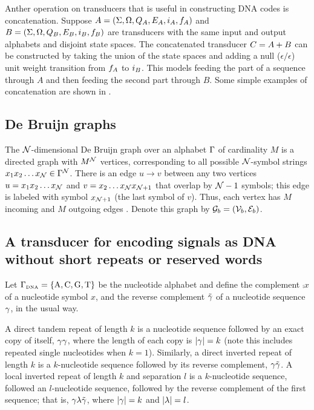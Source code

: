 \documentclass[english]{article}
\begin{document}
Anther operation on transducers that is useful in constructing DNA codes
is concatenation.
Suppose
 $A = (\Sigma, \Omega, Q_A, E_A, i_A, f_A)$ and
 $B = (\Sigma, \Omega, Q_B, E_B, i_B, f_B)$
are transducers with the same input and output alphabets and disjoint state spaces.
The concatenated transducer $C = A + B$ can be constructed by
taking the union of the state spaces and adding a null ($\epsilon/\epsilon$) unit weight transition
from $f_A$ to $i_B$.
This models feeding the part of a sequence through $A$ and then feeding the second part through $B$.
Some simple examples of concatenation are shown in .

\subsection{De Bruijn graphs}

The ${\cal N}$-dimensional De Bruijn graph over an alphabet $\Gamma$ of cardinality $M$
is a directed graph with $M^{\cal N}$ vertices,
corresponding to all possible ${\cal N}$-symbol strings
$x_1 x_2 \ldots x_{\cal N} \in \Gamma^{\cal N}$.
There is an edge $u \to v$ between any two vertices
$u=x_1 x_2 \ldots x_{\cal N}$ and $v=x_2 \ldots x_{\cal N} x_{{\cal N}+1}$
that overlap by ${\cal N}-1$ symbols; this edge is labeled with symbol $x_{{\cal N}+1}$ (the last symbol of $v$).
Thus, each vertex has $M$ incoming and $M$ outgoing edges \cite{DeBruijn1946,PevznerEtAl2001}.
Denote this graph by ${\cal G}_b = ({\cal V}_b,{\cal E}_b)$.

\subsection{A transducer for encoding signals as DNA without short repeats or reserved words}

Let $\Gamma_{\mbox{\tiny DNA}} = \{ \mbox{A}, \mbox{C}, \mbox{G}, \mbox{T} \} $ be the nucleotide alphabet and define the complement $\comp{x}$ of a nucleotide symbol $x$,
and the reverse complement $\tilde{\gamma}$ of a nucleotide sequence $\gamma$, in the usual way.

A direct tandem repeat of length $k$ is a nucleotide sequence followed by an exact copy of itself, $\gamma \gamma$, where the length of each copy is $|\gamma|=k$
(note this includes repeated single nucleotides when $k=1$).
Similarly, a direct inverted repeat of length $k$ is a $k$-nucleotide sequence followed by its reverse complement, $\gamma \tilde{\gamma}$.
A local inverted repeat of length $k$ and separation $l$ is a $k$-nucleotide sequence, followed an $l$-nucleotide sequence, followed by the reverse complement
of the first sequence; that is, $\gamma \lambda \tilde{\gamma}$, where $|\gamma|=k$ and $|\lambda|=l$.
\end{document}
